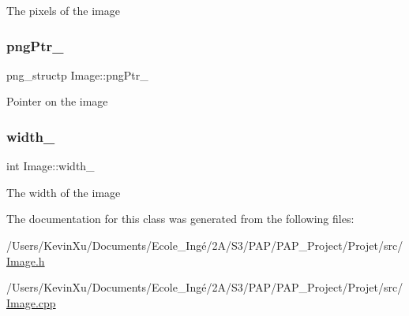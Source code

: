 The pixels of the image \mbox{\label{class_image_aaf607d2596bac09b13370599d9ba6d8c}} 
\subsubsection{\texorpdfstring{png\+Ptr\+\_\+}{pngPtr\_}}
{\footnotesize\ttfamily png\+\_\+structp Image\+::png\+Ptr\+\_\+\hspace{0.3cm}{\ttfamily [private]}}

Pointer on the image \mbox{\label{class_image_a4c2d8a01ecf1b7438f57f93357080e08}} 
\subsubsection{\texorpdfstring{width\+\_\+}{width\_}}
{\footnotesize\ttfamily int Image\+::width\+\_\+\hspace{0.3cm}{\ttfamily [private]}}

The width of the image 

The documentation for this class was generated from the following files\+:\begin{DoxyCompactItemize}
\item 
/\+Users/\+Kevin\+Xu/\+Documents/\+Ecole\+\_\+\+Ingé/2\+A/\+S3/\+P\+A\+P/\+P\+A\+P\+\_\+\+Project/\+Projet/src/\mbox{\hyperlink{_image_8h}{Image.\+h}}\item 
/\+Users/\+Kevin\+Xu/\+Documents/\+Ecole\+\_\+\+Ingé/2\+A/\+S3/\+P\+A\+P/\+P\+A\+P\+\_\+\+Project/\+Projet/src/\mbox{\hyperlink{_image_8cpp}{Image.\+cpp}}\end{DoxyCompactItemize}
